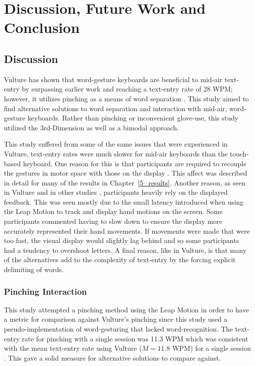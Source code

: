 \chapter{Discussion, Future Work and Conclusion}
\section{Discussion}
Vulture has shown that word-gesture keyboards are beneficial to mid-air text-entry by surpassing earlier work and reaching a text-entry rate of 28 WPM; however, it utilizes pinching as a means of word separation \cite{ref_vulture}. This study aimed to find alternative solutions to word separation and interaction with mid-air, word-gesture keyboards. Rather than pinching or inconvenient glove-use, this study utilized the 3rd-Dimension as well as a bimodal approach.

This study suffered from some of the same issues that were experienced in Vulture, text-entry rates were much slower for mid-air keyboards than the touch-based keyboard. One reason for this is that participants are required to recouple the gestures in motor space with those on the display \cite{ref_vulture}. This affect was described in detail for many of the results in Chapter~\ref{5_results}. Another reason, as seen in Vulture and in other studies \cite{ref_vulture,ref_visual_feedback_focus}, participants heavily rely on the displayed feedback. This was seen mostly due to the small latency introduced when using the Leap Motion to track and display hand motions on the screen. Some participants commented having to slow down to ensure the display more accurately represented their hand movements. If movements were made that were too fast, the visual display would slightly lag behind and so some participants had a tendency to overshoot letters. A final reason, like in Vulture, is that many of the alternatives add to the complexity of text-entry by the forcing explicit delimiting of words. 

\subsection{Pinching Interaction}
This study attempted a pinching method using the Leap Motion in order to have a metric for comparison against Vulture's pinching since this study used a pseudo-implementation of word-gesturing that lacked word-recognition. The text-entry rate for pinching with a single session was 11.3 WPM which was consistent with the mean text-entry rate using Vulture ($M = 11.8$ WPM) for a single session \cite{ref_vulture}. This gave a solid measure for alternative solutions to compare against.

